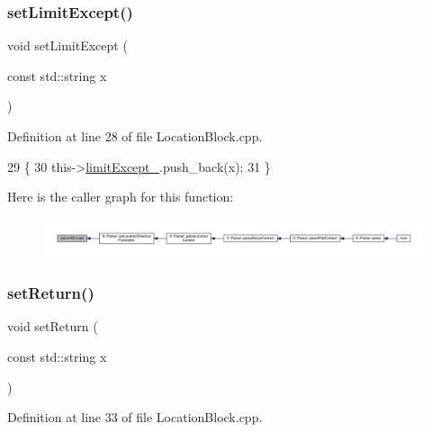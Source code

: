 \subsubsection{\texorpdfstring{set\+Limit\+Except()}{setLimitExcept()}}
{\footnotesize\ttfamily void set\+Limit\+Except (\begin{DoxyParamCaption}\item[{const std\+::string}]{x }\end{DoxyParamCaption})}



Definition at line 28 of file Location\+Block.\+cpp.


\begin{DoxyCode}
29     \{
30         this->\hyperlink{classft_1_1_location_block_a8fec53119566b5654a7b902a1c53c6d9}{limitExcept\_}.push\_back(x);
31     \}
\end{DoxyCode}
Here is the caller graph for this function\+:
\nopagebreak
\begin{figure}[H]
\begin{center}
\leavevmode
\includegraphics[width=350pt]{classft_1_1_location_block_a307df676bb22688bb58396dd2c457848_icgraph}
\end{center}
\end{figure}
\mbox{\label{classft_1_1_location_block_a041d07c701e052b114ef353d5e588998}} 
\subsubsection{\texorpdfstring{set\+Return()}{setReturn()}}
{\footnotesize\ttfamily void set\+Return (\begin{DoxyParamCaption}\item[{const std\+::string}]{x }\end{DoxyParamCaption})}



Definition at line 33 of file Location\+Block.\+cpp.


